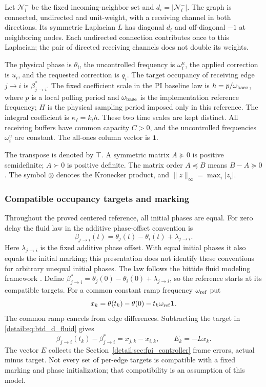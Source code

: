 Let $\mathcal N_i^-$ be the fixed incoming-neighbor set and
$d_i=|\mathcal N_i^-|$. The graph is connected, undirected and unit-weight,
with a receiving channel in both directions. Its symmetric Laplacian
$L$ has diagonal $d_i$ and off-diagonal $-1$ at neighboring nodes. Each
undirected connection contributes once to this Laplacian; the pair of
directed receiving channels does not double its weights.

The physical phase is $\theta_i$, the uncontrolled frequency is
$\omega_i^u$, the applied correction is $u_i$, and the requested correction
is $q_i$. The target occupancy of receiving edge $j\to i$ is
$\beta^*_{j\to i}$. The fixed coefficient scale in the PI baseline law is
$h=p/\omega_{\rm base}$, where $p$ is a local polling period and
$\omega_{\rm base}$ is the implementation reference frequency; $H$ is the
physical sampling period imposed only in this reference. The integral
coefficient is $\kappa_I=k_i h$. These two time scales are kept distinct.
All receiving buffers have common capacity $C>0$, and the uncontrolled
frequencies $\omega_i^u$ are constant. The all-ones column vector is $\mathbf1$.

The transpose is denoted by $\top$. A symmetric matrix $A\succeq0$ is
positive semidefinite; $A\succ0$ is positive definite. The matrix order
$A\preceq B$ means $B-A\succeq0$. The symbol $\otimes$ denotes the
Kronecker product, and $\|z\|_\infty=\max_i|z_i|$.

\subsubsection{Compatible occupancy targets and marking}
Throughout the proved centered reference, all initial phases are equal.
For zero delay the fluid law in the additive phase-offset convention is
\begin{equation}
 \beta_{j\to i}(t)=\theta_j(t)-\theta_i(t)+\lambda_{j\to i}.
 \label{detail:eq:btd_d_fluid}
\end{equation}
Here $\lambda_{j\to i}$ is the fixed additive phase offset. With equal
initial phases it also equals the initial marking; this presentation does
not identify these conventions for arbitrary unequal initial phases.
The law follows the bittide fluid modeling framework
\cite{lall2024logicalSynchrony,lall2022resistance}. Define
$\beta^*_{j\to i}=\theta_j(0)-\theta_i(0)+\lambda_{j\to i}$, so the
reference starts at its compatible targets. For a common constant ramp
frequency $\omega_{\rm ref}$ put
\begin{equation}
 x_k=\theta(t_k)-\theta(0)-t_k\omega_{\rm ref}\mathbf1.
 \label{detail:eq:btd_ref_state}
\end{equation}
The common ramp cancels from edge differences. Subtracting the target in
\eqref{detail:eq:btd_d_fluid} gives
\begin{equation}
 \beta_{j\to i}(t_k)-\beta^*_{j\to i}=x_{j,k}-x_{i,k},\qquad E_k=-Lx_k.
 \label{detail:eq:btd_buffer_phase}
\end{equation}
The vector $E$ collects the Section~\ref{detail:sec:fpi_controller} frame errors, actual minus target.
Not every set of per-edge targets is compatible with a fixed marking and
phase initialization; that compatibility is an assumption of this model.

